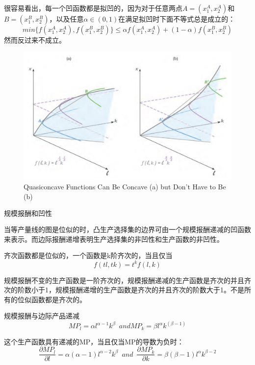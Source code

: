 \documentclass{article}
\begin{document}
很容易看出，每一个凹函数都是拟凹的，因为对于任意两点$ A=(x^A_1,x^A_2) $和$ B=(x^B_1,x^B_2) $，以及任意$ \alpha\in (0,1) $在满足拟凹时下面不等式总是成立的：
\[
min\{f(x^A_1,x^A_2),f(x^B_1,x^B_2)\}\le \alpha f(x^A_1,x^A_2)+(1-\alpha)f(x^B_1,x^B_2)
\]
然而反过来不成立。 

\begin{figure}[H] %
	\centering %
	\includegraphics[width=1\textwidth]{12_4} %
	\caption{Quasiconcave Functions Can Be Concave (a) but Don’t Have to Be (b)} %
	\label{Fig.main5} %
\end{figure}

\hspace*{\fill}

规模报酬和凹性

当等产量线的图是位似的时，凸生产选择集的边界可由一个规模报酬递减的凹函数来表示。而边际报酬递增表明生产选择集的非凹性和生产函数的非凹性。

齐次函数都是位似的，一个函数是k阶齐次的，当且仅当
\[
f(tl,tk)=t^kf(l,k)
\]

规模报酬不变的生产函数是一阶齐次的，规模报酬递减的生产函数是齐次的并且齐次的阶数小于1，规模报酬递增的生产函数是齐次的并且齐次的阶数大于1。不是所有的位似函数都是齐次的。

\hspace*{\fill}

规模报酬与边际产品递减
\[
MP_l=\alpha l^{\alpha-1}k^\beta\enspace and MP_k=\beta l^\alpha k^(\beta-1)
\]

这个生产函数具有递减的MP，当且仅当MP的导数为负时：
\[
\frac{\partial MP_l}{\partial l}=\alpha(\alpha-1)l^{\alpha-2}k^\beta\enspace and \enspace\frac{\partial MP_k}{\partial k}=\beta(\beta-1)l^\alpha k^{\beta-2}
\]
\end{document}
